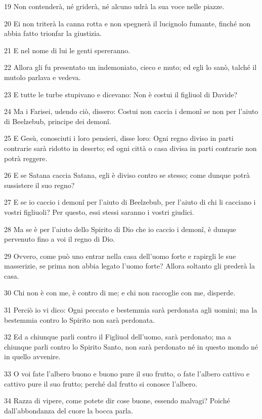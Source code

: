 \par 19 Non contenderà, né griderà, né alcuno udrà la sua voce nelle piazze.
\par 20 Ei non triterà la canna rotta e non spegnerà il lucignolo fumante, finché non abbia fatto trionfar la giustizia.
\par 21 E nel nome di lui le genti spereranno.
\par 22 Allora gli fu presentato un indemoniato, cieco e muto; ed egli lo sanò, talché il mutolo parlava e vedeva.
\par 23 E tutte le turbe stupivano e dicevano: Non è costui il figliuol di Davide?
\par 24 Ma i Farisei, udendo ciò, dissero: Costui non caccia i demonî se non per l'aiuto di Beelzebub, principe dei demonî.
\par 25 E Gesù, conosciuti i loro pensieri, disse loro: Ogni regno diviso in parti contrarie sarà ridotto in deserto; ed ogni città o casa divisa in parti contrarie non potrà reggere.
\par 26 E se Satana caccia Satana, egli è diviso contro se stesso; come dunque potrà sussistere il suo regno?
\par 27 E se io caccio i demonî per l'aiuto di Beelzebub, per l'aiuto di chi li cacciano i vostri figliuoli? Per questo, essi stessi saranno i vostri giudici.
\par 28 Ma se è per l'aiuto dello Spirito di Dio che io caccio i demonî, è dunque pervenuto fino a voi il regno di Dio.
\par 29 Ovvero, come può uno entrar nella casa dell'uomo forte e rapirgli le sue masserizie, se prima non abbia legato l'uomo forte? Allora soltanto gli prederà la casa.
\par 30 Chi non è con me, è contro di me; e chi non raccoglie con me, disperde.
\par 31 Perciò io vi dico: Ogni peccato e bestemmia sarà perdonata agli uomini; ma la bestemmia contro lo Spirito non sarà perdonata.
\par 32 Ed a chiunque parli contro il Figliuol dell'uomo, sarà perdonato; ma a chiunque parli contro lo Spirito Santo, non sarà perdonato né in questo mondo né in quello avvenire.
\par 33 O voi fate l'albero buono e buono pure il suo frutto, o fate l'albero cattivo e cattivo pure il suo frutto; perché dal frutto si conosce l'albero.
\par 34 Razza di vipere, come potete dir cose buone, essendo malvagi? Poiché dall'abbondanza del cuore la bocca parla.
